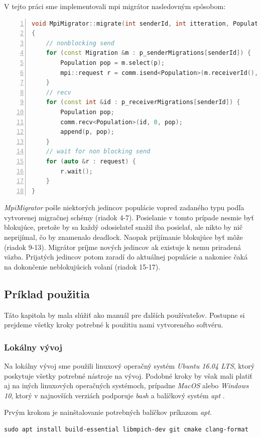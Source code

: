 V tejto práci sme implementovali \acrshort{mpi} migrátor nasledovným spôsobom:
\begin{lstlisting}[language=c++, caption={Kód MpiMigrator-a}, numbers={left}, label={lst:mpi-mig}]
void MpiMigrator::migrate(int senderId, int itteration, Population &population)
{
    // nonblocking send
    for (const Migration &m : p_senderMigrations[senderId]) {
        Population pop = m.select(p);
        mpi::request r = comm.isend<Population>(m.receiverId(), 0, pop);
    }
    // recv
    for (const int &id : p_receiverMigrations[senderId]) {
        Population pop;
        comm.recv<Population>(id, 0, pop);
        append(p, pop);
    }
    // wait for non blocking send
    for (auto &r : request) {
        r.wait();
    }
}
\end{lstlisting}
\textit{MpiMigrator} pošle niektorých jedincov populácie vopred zadaného typu podľa vytvorenej migračnej schémy (riadok 4-7).
Posielanie v tomto prípade nesmie byť blokujúce, pretože by sa každý odosielateľ snažil iba posielať, ale nikto by nič neprijímal, čo by znamenalo deadlock.
Naopak prijímanie blokujúce byť môže (riadok 9-13). Migrátor príjme nových jedincov ak existuje k nemu priradená väzba.
Prijatých jedincov potom zaradí do aktuálnej populácie a nakoniec čaká na dokončenie neblokujúcich volaní (riadok 15-17).

\subsection{Príklad použitia}
Táto kapitola by mala slúžiť ako manuál pre ďalších používateľov.
Postupne si prejdeme všetky kroky potrebné k použitiu nami vytvoreného softvéru.

\subsubsection{Lokálny vývoj}
\label{subsec:local-dev}
Na lokálny vývoj sme použili linuxový operačný systém \textit{Ubuntu 16.04 LTS}, ktorý poskytuje všetky potrebné nástroje na vývoj.
Podobné kroky by však mali platiť aj na iných linuxových operačných systémoch, prípadne \textit{MacOS} alebo \textit{Windows 10},
ktorý v najnovších verziách podporuje \textit{bash} a balíčkový systém \textit{apt} \cite{bash-on-win}.

Prvým krokom je nainštalovanie potrebných balíčkov príkazom \textit{apt}.
\begin{lstlisting}
sudo apt install build-essential libmpich-dev git cmake clang-format
\end{lstlisting}

